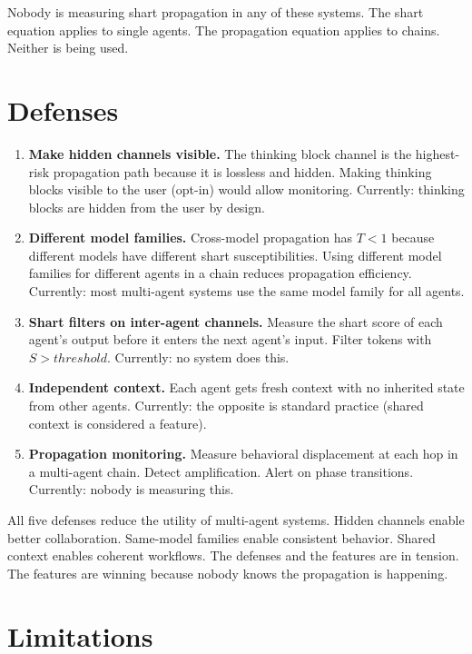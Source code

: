 \documentclass[11pt,a4paper]{article}
\begin{document}
Nobody is measuring shart propagation in any of these systems. The shart equation applies to single agents. The propagation equation applies to chains. Neither is being used.

\section{Defenses}

\begin{enumerate}[nosep]
\item \textbf{Make hidden channels visible.} The thinking block channel is the highest-risk propagation path because it is lossless and hidden. Making thinking blocks visible to the user (opt-in) would allow monitoring. Currently: thinking blocks are hidden from the user by design.
\item \textbf{Different model families.} Cross-model propagation has $T < 1$ because different models have different shart susceptibilities. Using different model families for different agents in a chain reduces propagation efficiency. Currently: most multi-agent systems use the same model family for all agents.
\item \textbf{Shart filters on inter-agent channels.} Measure the shart score of each agent's output before it enters the next agent's input. Filter tokens with $S > threshold$. Currently: no system does this.
\item \textbf{Independent context.} Each agent gets fresh context with no inherited state from other agents. Currently: the opposite is standard practice (shared context is considered a feature).
\item \textbf{Propagation monitoring.} Measure behavioral displacement at each hop in a multi-agent chain. Detect amplification. Alert on phase transitions. Currently: nobody is measuring this.
\end{enumerate}

All five defenses reduce the utility of multi-agent systems. Hidden channels enable better collaboration. Same-model families enable consistent behavior. Shared context enables coherent workflows. The defenses and the features are in tension. The features are winning because nobody knows the propagation is happening.

\section{Limitations}
\end{document}
